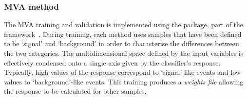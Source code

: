 
\subsubsection{MVA method}
\label{sec:mvamethod}

The MVA training and validation is implemented using the \tmva package, part of the \root framework~\cite{BRUN199781}.
During training, each method uses samples that have been defined to be `signal' and `background' in order to characterise the differences between the two categories. The multidimensional space defined by the input variables is effectively condensed onto a single axis given by the classifier's response. Typically, high values of the response correspond to `signal'-like events and low values to `background'-like events. This training produces a \emph{weights file} allowing the response to be calculated for other samples. 

